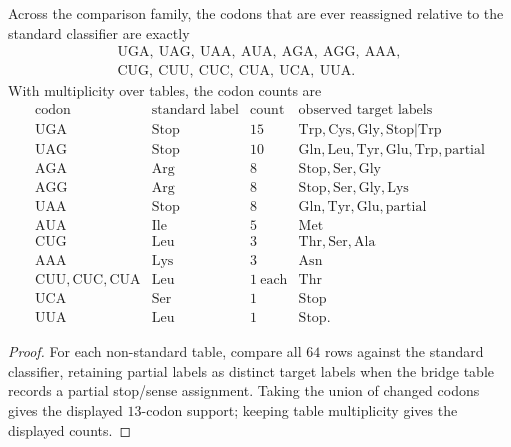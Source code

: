 \begin{theorem}
\label{thm:philosophy-sparse-reassignment-codon-support}
Across the comparison family, the codons that are ever reassigned
relative to the standard classifier are exactly
$$
\begin{gathered}
  \mathrm{UGA},\ \mathrm{UAG},\ \mathrm{UAA},\ \mathrm{AUA},\
  \mathrm{AGA},\ \mathrm{AGG},\ \mathrm{AAA},\\
  \mathrm{CUG},\ \mathrm{CUU},\ \mathrm{CUC},\ \mathrm{CUA},\
  \mathrm{UCA},\ \mathrm{UUA}.
\end{gathered}
$$
With multiplicity over tables, the codon counts are
$$
\begin{array}{c|c|r|l}
  \text{codon} & \text{standard label} & \text{count}
    & \text{observed target labels}\\
\hline
  \mathrm{UGA} & \mathrm{Stop} & 15 & \mathrm{Trp},\mathrm{Cys},\mathrm{Gly},\mathrm{Stop|Trp}\\
  \mathrm{UAG} & \mathrm{Stop} & 10 & \mathrm{Gln},\mathrm{Leu},\mathrm{Tyr},\mathrm{Glu},\mathrm{Trp},\mathrm{partial}\\
  \mathrm{AGA} & \mathrm{Arg} & 8 & \mathrm{Stop},\mathrm{Ser},\mathrm{Gly}\\
  \mathrm{AGG} & \mathrm{Arg} & 8 & \mathrm{Stop},\mathrm{Ser},\mathrm{Gly},\mathrm{Lys}\\
  \mathrm{UAA} & \mathrm{Stop} & 8 & \mathrm{Gln},\mathrm{Tyr},\mathrm{Glu},\mathrm{partial}\\
  \mathrm{AUA} & \mathrm{Ile} & 5 & \mathrm{Met}\\
  \mathrm{CUG} & \mathrm{Leu} & 3 & \mathrm{Thr},\mathrm{Ser},\mathrm{Ala}\\
  \mathrm{AAA} & \mathrm{Lys} & 3 & \mathrm{Asn}\\
  \mathrm{CUU},\mathrm{CUC},\mathrm{CUA} & \mathrm{Leu} & 1\ \text{each} & \mathrm{Thr}\\
  \mathrm{UCA} & \mathrm{Ser} & 1 & \mathrm{Stop}\\
  \mathrm{UUA} & \mathrm{Leu} & 1 & \mathrm{Stop}.
\end{array}
$$
\end{theorem}
\begin{proof}
For each non-standard table, compare all $64$ rows against the standard
classifier, retaining partial labels as distinct target labels when the
bridge table records a partial stop/sense assignment. Taking the union
of changed codons gives the displayed $13$-codon support; keeping table
multiplicity gives the displayed counts.
\end{proof}

